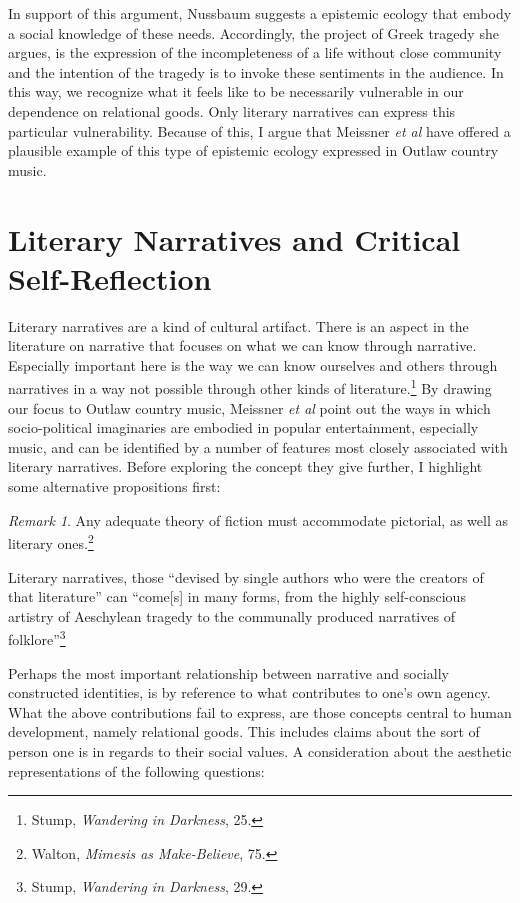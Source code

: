 \documentclass[
  12pt,
]{book}
\theoremstyle{definition}
\theoremstyle{definition}
\theoremstyle{definition}
\theoremstyle{definition}
\theoremstyle{remark}
\newtheorem*{remark}{Remark}
\begin{document}
In support of this argument, Nussbaum suggests a epistemic ecology that embody a social knowledge of these needs. Accordingly, the project of Greek tragedy she argues, is the expression of the incompleteness of a life without close community and the intention of the tragedy is to invoke these sentiments in the audience. In this way, we recognize what it feels like to be necessarily vulnerable in our dependence on relational goods. Only literary narratives can express this particular vulnerability. Because of this, I argue that Meissner \emph{et al} have offered a plausible example of this type of epistemic ecology expressed in Outlaw country music.

\section{Literary Narratives and Critical Self-Reflection}\label{literary-narratives-and-critical-self-reflection}

Literary narratives are a kind of cultural artifact. There is an aspect in the literature on narrative that focuses on what we can know through narrative. Especially important here is the way we can know ourselves and others through narratives in a way not possible through other kinds of literature.\footnote{Stump, \emph{Wandering in {Darkness}}, 25.} By drawing our focus to Outlaw country music, Meissner \emph{et al} point out the ways in which socio-political imaginaries are embodied in popular entertainment, especially music, and can be identified by a number of features most closely associated with literary narratives. Before exploring the concept they give further, I highlight some alternative propositions first:

\begin{remark}
Any adequate theory of fiction must accommodate pictorial, as well as literary ones.\footnote{Walton, \emph{Mimesis as {Make-Believe}}, 75.}

Literary narratives, those ``devised by single authors who were the creators of that literature'' can ``come{[}s{]} in many forms, from the highly self-conscious artistry of Aeschylean tragedy to the communally produced narratives of folklore''\footnote{Stump, \emph{Wandering in {Darkness}}, 29.}
\end{remark}

Perhaps the most important relationship between narrative and socially constructed identities, is by reference to what contributes to one's own agency. What the above contributions fail to express, are those concepts central to human development, namely relational goods. This includes claims about the sort of person one is in regards to their social values. A consideration about the aesthetic representations of the following questions:
\end{document}
